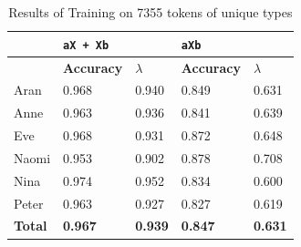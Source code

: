 \FloatBarrier
\FloatBarrier
\begin{table}[!h]
\centering
\caption{Results of Training on 7355 tokens of unique types}
\label{tabletable:4}
\begin{tabular}{lllll}
\hline
 & \multicolumn{2}{l}{\textbf{\texttt{aX + Xb}}} & \multicolumn{2}{l}{\textbf{\texttt{aXb}}} \\ \hline
 & \textbf{Accuracy} & \textbf{$\lambda$} & \textbf{Accuracy} & \textbf{$\lambda$} \\ \hline
Aran & 0.968 & 0.940 & 0.849 & 0.631 \\
Anne & 0.963 & 0.936 & 0.841 & 0.639 \\
Eve & 0.968 & 0.931 & 0.872 & 0.648 \\
Naomi & 0.953 & 0.902 & 0.878 & 0.708 \\
Nina & 0.974 & 0.952 & 0.834 & 0.600 \\
Peter & 0.963 & 0.927 & 0.827 & 0.619 \\
\textbf{Total} & \textbf{0.967} & \textbf{0.939} & \textbf{0.847} & \textbf{0.631} \\ \hline
\end{tabular}
\end{table}
\FloatBarrier

